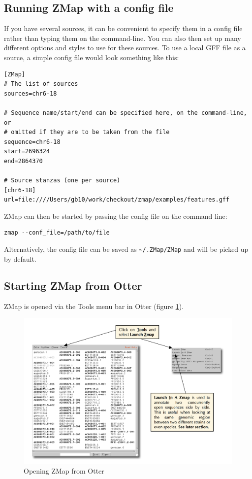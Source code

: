 \documentclass[letterpaper]{article}
\begin{document}
\subsection{Running ZMap with a config file}
If you have several sources, it can be convenient to specify them in a config file rather than typing them on the command-line. You can also then set up many different options and styles to use for these sources. To use a local GFF file as a source, a simple config file would look something like this:
\begin{lstlisting}
[ZMap]
# The list of sources
sources=chr6-18

# Sequence name/start/end can be specified here, on the command-line, or
# omitted if they are to be taken from the file
sequence=chr6-18
start=2696324
end=2864370

# Source stanzas (one per source)
[chr6-18]
url=file:////Users/gb10/work/checkout/zmap/examples/features.gff
\end{lstlisting}

ZMap can then be started by passing the config file on the command line:
\begin{lstlisting}
zmap --conf_file=/path/to/file
\end{lstlisting}

Alternatively, the config file can be saved as \lstinline{~/.ZMap/ZMap} and will be picked up by default.

\subsection{Starting ZMap from Otter}
ZMap is opened via the Tools menu bar in Otter (figure \ref{img_open_from_otterlace}).

\begin{figure}
\centering
\color[rgb]{0.30980393,0.5058824,0.7411765}
\includegraphics[width=15.231cm]{img_open_from_otterlace.png}
\caption{Opening ZMap from Otter}
\label{img_open_from_otterlace}
\end{figure}
\end{document}
